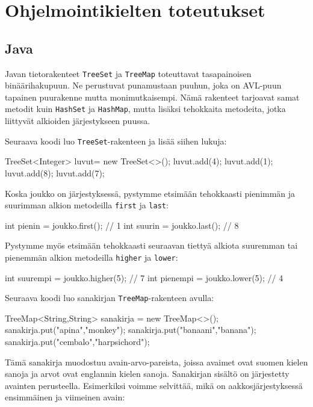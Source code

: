 \section{Ohjelmointikielten toteutukset}

\subsection{Java}

Javan tietorakenteet \texttt{TreeSet} ja \texttt{TreeMap}
toteuttavat tasapainoisen binääri\-hakupuun.
Ne perustuvat punamustaan puuhun, joka on AVL-puun tapainen
puurakenne mutta monimutkaisempi.
Nämä rakenteet tarjoavat samat metodit kuin
\texttt{HashSet} ja \texttt{HashMap},
mutta lisäksi tehokkaita metodeita,
jotka liittyvät alkioiden järjestykseen puussa.

Seuraava koodi luo \texttt{TreeSet}-rakenteen
ja lisää siihen lukuja:

\begin{code}
TreeSet<Integer> luvut= new TreeSet<>();
luvut.add(4);
luvut.add(1);
luvut.add(8);
luvut.add(7);
\end{code}

Koska joukko on järjestyksessä, pystymme etsimään tehokkaasti
pienim\-män ja suurimman alkion metodeilla \texttt{first} ja \texttt{last}:

\begin{code}
int pienin = joukko.first(); // 1
int suurin = joukko.last(); // 8
\end{code}

Pystymme myös etsimään tehokkaasti seuraavan tiettyä alkiota
suuremman tai pienemmän alkion metodeilla \texttt{higher} ja \texttt{lower}:

\begin{code}
int suurempi = joukko.higher(5); // 7
int pienempi = joukko.lower(5); // 4
\end{code}

Seuraava koodi luo sanakirjan \texttt{TreeMap}-rakenteen avulla:

\begin{code}
TreeMap<String,String> sanakirja = new TreeMap<>();
sanakirja.put("apina","monkey");
sanakirja.put("banaani","banana");
sanakirja.put("cembalo","harpsichord");
\end{code}

Tämä sanakirja muodostuu avain-arvo-pareista,
joissa avaimet ovat suomen kielen sanoja
ja arvot ovat englannin kielen sanoja.
Sanakirjan sisältö on järjestetty avainten perusteella.
Esimerkiksi voimme selvittää, mikä on aakkosjärjestyksessä
ensimmäinen ja viimeinen avain:


